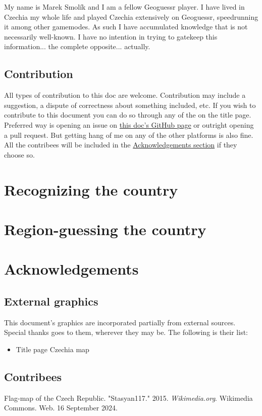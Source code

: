 \documentclass[12pt, oneside]{article}
\begin{document}
My name is Marek Smolík and I am a fellow Geoguessr player. I have lived in Czechia my whole life and played Czechia extensively on Geoguessr, speedrunning it among other gamemodes. As such I have accumulated knowledge that is not necessarily well-known. I have no intention in trying to gatekeep this information... the complete opposite... actually.

\subsection{Contribution}

All types of contribution to this doc are welcome. Contribution may include a suggestion, a dispute of correctness about something included, etc. If you wish to contribute to this document you can do so through any of the on the title page. Preferred way is opening an issue on \href{https://github.com/dynamo58/geoguessr-czechia-guide}{this doc's GitHub page} or outright opening a pull request. But getting hang of me on any of the other platforms is also fine. All the contribees will be included in the \hyperref[sec:ack]{Acknowledgements section} if they choose so.

\newpage
\section{Recognizing the country}

\newpage
\section{Region-guessing the country}

\newpage
\section{Acknowledgements}
\label{sec:ack}

\subsection{External graphics}

This document's graphics are incorporated partially from external sources. Special thanks goes to them, wherever they may be. The following is their list:

\begin{itemize}
  \item Title page Czechia map\cite{gr1}
\end{itemize}

\subsection{Contribees}




\begin{thebibliography}{e}
Flag-map of the Czech Republic. "Stasyan117." 2015. \textit{Wikimedia.org}. Wikimedia Commons. Web. 16 September 2024.


\end{thebibliography}
\end{document}

